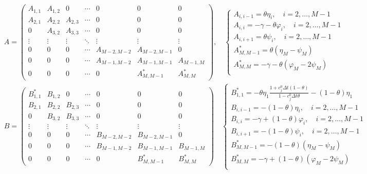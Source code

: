 \begin{align*}
    &\boxed{
        A = \begin{pmatrix}
            A_{1,1} & A_{1,2} & 0 & \cdots & 0 & 0 & 0 \\
            A_{2,1} & A_{2,2} & A_{2,3} & \cdots & 0 & 0 & 0 \\
            0 & A_{3,2} & A_{3,3} & \cdots & 0 & 0 & 0 \\
            \vdots & \vdots & \vdots & \ddots & \vdots & \vdots & \vdots \\
            0 & 0 & 0 & \cdots & A_{M-2,M-2} & A_{M-2,M-1} & 0 \\
            0 & 0 & 0 & \cdots & A_{M-1,M-2} & A_{M-1,M-1} & A_{M-1,M} \\
            0 & 0 & 0 & \cdots & 0  & A_{M,M-1}^* & A_{M,M}^*
        \end{pmatrix},
        \quad \begin{cases}
            A_{i,i-1} = \theta\eta_i, \quad i=2,\ldots,M-1\\
            A_{i,i} = -\gamma - \theta \varphi_i, \quad i=2,\ldots,M-1\\
            A_{i,i+1} = \theta\psi_i, \quad i=2,\ldots,M-1\\
            A_{M,M-1}^* = \theta(\eta_M - \psi_M)\\
            A_{M,M}^* = -\gamma - \theta (\varphi_M - 2\psi_M)\\
        \end{cases}
    } \\
    & \boxed{
        B = \begin{pmatrix}
            B_{1,1}^* & B_{1,2} & 0 & \cdots & 0 & 0 & 0 \\
            B_{2,1} & B_{2,2} & B_{2,3} & \cdots & 0 & 0 & 0 \\
            0 & B_{3,2} & B_{3,3} & \cdots & 0 & 0 & 0 \\
            \vdots & \vdots & \vdots & \ddots & \vdots & \vdots & \vdots \\
            0 & 0 & 0 & \cdots & B_{M-2,M-2} & B_{M-2,M-1} & 0 \\
            0 & 0 & 0 & \cdots & B_{M-1,M-2} & B_{M-1,M-1} & B_{M-1,M} \\
            0 & 0 & 0 & \cdots & 0  & B_{M,M-1}^* & B_{M,M}^*
        \end{pmatrix}
        \quad \begin{cases}
            B_{1,1}^* = -\theta\eta_1 \frac{1 + c_j^0 \Delta t (1-\theta)}{1 - c_j^0 \Delta t \theta} - (1-\theta)\eta_1 \\
            B_{i,i-1} = -(1-\theta)\eta_i, \quad i=2,\ldots,M-1\\
            B_{i,i} = -\gamma + (1-\theta) \varphi_i, \quad i=2,\ldots,M-1\\
            B_{i,i+1} = -(1-\theta)\psi_i, \quad i=2,\ldots,M-1\\
            B_{M,M-1}^* = -(1-\theta)(\eta_M - \psi_M)\\
            B_{M,M}^* = -\gamma + (1-\theta) (\varphi_M - 2\psi_M)\\
        \end{cases}
    }
\end{align*}
